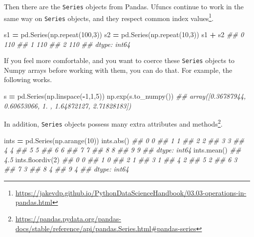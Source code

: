\documentclass[
  12pt,
  krantz2]{krantz}
\makeatletter
\newenvironment{Shaded}{\begin{snugshade}}{\end{snugshade}}
\newcommand{\BuiltInTok}[1]{#1}
\newcommand{\CommentTok}[1]{\textcolor[rgb]{0.37,0.37,0.37}{\textit{#1}}}
\newcommand{\DecValTok}[1]{\textcolor[rgb]{0.06,0.06,0.06}{#1}}
\newcommand{\NormalTok}[1]{#1}
\newcommand{\OperatorTok}[1]{\textcolor[rgb]{0.43,0.43,0.43}{\textbf{#1}}}
\renewcommand{\href}[2]{#2\footnote{\url{#1}}}
\newenvironment{kframe}{%
\medskip{}
\setlength{\fboxsep}{.8em}
 \def\at@end@of@kframe{}%
 \ifinner\ifhmode%
  \def\at@end@of@kframe{\end{minipage}}%
  \begin{minipage}{\columnwidth}%
 \fi\fi%
 \def\FrameCommand##1{\hskip\@totalleftmargin \hskip-\fboxsep
 \colorbox{shadecolor}{##1}\hskip-\fboxsep
     \hskip-\linewidth \hskip-\@totalleftmargin \hskip\columnwidth}%
 \MakeFramed {\advance\hsize-\width
   \@totalleftmargin\z@ \linewidth\hsize
   \@setminipage}}%
 {\par\unskip\endMakeFramed%
 \at@end@of@kframe}
\renewenvironment{Shaded}{\begin{kframe}}{\end{kframe}}
\makeatother
\begin{document}
Then there are the \texttt{Series} objects from Pandas. Ufuncs continue to work in the same way on \texttt{Series} objects, and they \href{https://jakevdp.github.io/PythonDataScienceHandbook/03.03-operations-in-pandas.html}{respect common index values}.

\begin{Shaded}
\begin{Highlighting}[]
\NormalTok{s1 }\OperatorTok{=}\NormalTok{ pd.Series(np.repeat(}\DecValTok{100}\NormalTok{,}\DecValTok{3}\NormalTok{))}
\NormalTok{s2 }\OperatorTok{=}\NormalTok{ pd.Series(np.repeat(}\DecValTok{10}\NormalTok{,}\DecValTok{3}\NormalTok{))}
\NormalTok{s1 }\OperatorTok{+}\NormalTok{ s2}
\CommentTok{\#\# 0    110}
\CommentTok{\#\# 1    110}
\CommentTok{\#\# 2    110}
\CommentTok{\#\# dtype: int64}
\end{Highlighting}
\end{Shaded}

If you feel more comfortable, and you want to coerce these \texttt{Series} objects to Numpy arrays before working with them, you can do that. For example, the following works.

\begin{Shaded}
\begin{Highlighting}[]
\NormalTok{s }\OperatorTok{=}\NormalTok{ pd.Series(np.linspace(}\OperatorTok{{-}}\DecValTok{1}\NormalTok{,}\DecValTok{1}\NormalTok{,}\DecValTok{5}\NormalTok{))}
\NormalTok{np.exp(s.to\_numpy())}
\CommentTok{\#\# array([0.36787944, 0.60653066, 1.        , 1.64872127, 2.71828183])}
\end{Highlighting}
\end{Shaded}

In addition, \texttt{Series} objects possess many extra \href{https://pandas.pydata.org/pandas-docs/stable/reference/api/pandas.Series.html\#pandas-series}{attributes and methods}.

\begin{Shaded}
\begin{Highlighting}[]
\NormalTok{ints }\OperatorTok{=}\NormalTok{ pd.Series(np.arange(}\DecValTok{10}\NormalTok{))}
\NormalTok{ints.}\BuiltInTok{abs}\NormalTok{()}
\CommentTok{\#\# 0    0}
\CommentTok{\#\# 1    1}
\CommentTok{\#\# 2    2}
\CommentTok{\#\# 3    3}
\CommentTok{\#\# 4    4}
\CommentTok{\#\# 5    5}
\CommentTok{\#\# 6    6}
\CommentTok{\#\# 7    7}
\CommentTok{\#\# 8    8}
\CommentTok{\#\# 9    9}
\CommentTok{\#\# dtype: int64}
\NormalTok{ints.mean()}
\CommentTok{\#\# 4.5}
\NormalTok{ints.floordiv(}\DecValTok{2}\NormalTok{)}
\CommentTok{\#\# 0    0}
\CommentTok{\#\# 1    0}
\CommentTok{\#\# 2    1}
\CommentTok{\#\# 3    1}
\CommentTok{\#\# 4    2}
\CommentTok{\#\# 5    2}
\CommentTok{\#\# 6    3}
\CommentTok{\#\# 7    3}
\CommentTok{\#\# 8    4}
\CommentTok{\#\# 9    4}
\CommentTok{\#\# dtype: int64}
\end{Highlighting}
\end{Shaded}
\end{document}
